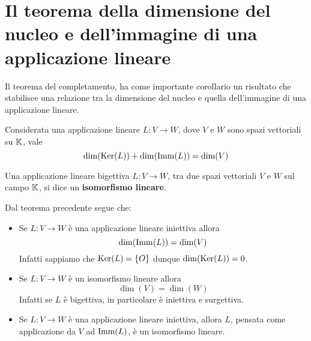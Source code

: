\section{Il teorema della dimensione del nucleo e dell'immagine di una applicazione lineare}
Il teorema del completamento, ha come importante corollario un risultato che stabilisce
una relazione tra la dimensione del nucleo e quella dell'immagine di una applicazione
lineare.

\begin{theorem}
	Considerata una applicazione lineare $L : V \to W$, dove $V$ e $W$ sono spazi
	vettoriali su $\mathbb{K}$, vale
	\[
		\dim(\operatorname{Ker}(L)) + \dim(\operatorname{Imm}(L)) = \dim(V)
	\]
\end{theorem}

\begin{definition}
	Una applicazione lineare bigettiva $L : V \to W$, tra due spazi vettoriali $V$ e $W$
	sul campo $\mathbb{K}$, si dice un \textbf{isomorfismo lineare}.

	Dal teorema precedente segue che:
	\begin{itemize}
		\item Se $L : V \to W$ è una applicazione lineare iniettiva allora
		      \[ \dim(\operatorname{Imm}(L)) = \dim(V) \]
		      Infatti sappiamo che $\operatorname{Ker}(L) = \{O\}$ dunque $\dim(\operatorname{Ker}(L)) = 0$.
		\item Se $L : V \to W$ è un isomorfismo lineare allora \[\dim(V) = \dim(W)\]
		      Infatti se $L$ è bigettiva, in particolare è iniettiva e surgettiva.
		\item Se $L : V \to W$ è una applicazione lineare iniettiva, allora $L$,
		      pensata come applicazione da $V$ ad $\operatorname{Imm}(L)$, è un isomorfismo lineare.
	\end{itemize}
\end{definition}

